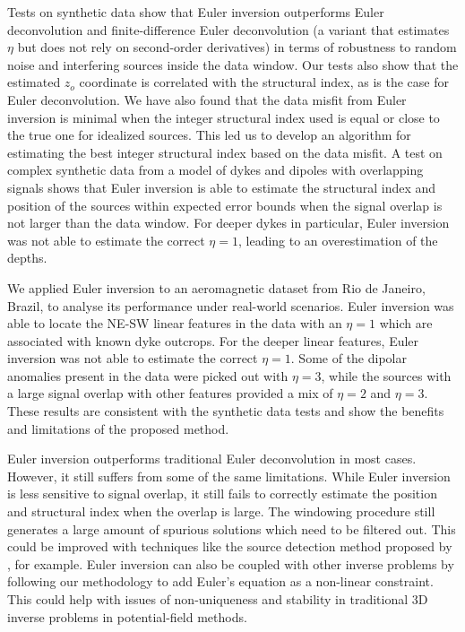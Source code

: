 Tests on synthetic data show that Euler inversion outperforms Euler
deconvolution and finite-dif\-fer\-ence Euler deconvolution (a variant that
estimates $\eta$ but does not rely on second-order derivatives) in terms of
robustness to random noise and interfering sources inside the data window.
Our tests also show that the estimated $z_o$ coordinate is correlated with the
structural index, as is the case for Euler deconvolution.
We have also found that the data misfit from Euler inversion is minimal when
the integer structural index used is equal or close to the true one for
idealized sources.
This led us to develop an algorithm for estimating the best integer structural
index based on the data misfit.
A test on complex synthetic data from a model of dykes and dipoles with
overlapping signals shows that Euler inversion is able to estimate the
structural index and position of the sources within expected error bounds when
the signal overlap is not larger than the data window.
For deeper dykes in particular, Euler inversion was not able to estimate the
correct $\eta=1$, leading to an overestimation of the depths.

We applied Euler inversion to an aeromagnetic dataset from Rio de Janeiro,
Brazil, to analyse its performance under real-world scenarios.
Euler inversion was able to locate the NE-SW linear features in the data with
an $\eta=1$ which are associated with known dyke outcrops.
For the deeper linear features, Euler inversion was not able to estimate the
correct $\eta=1$.
Some of the dipolar anomalies present in the data were picked out with
$\eta=3$, while the sources with a large signal overlap with other features
provided a mix of $\eta=2$ and $\eta=3$.
These results are consistent with the synthetic data tests and show the
benefits and limitations of the proposed method.

Euler inversion outperforms traditional Euler deconvolution in most cases.
However, it still suffers from some of the same limitations.
While Euler inversion is less sensitive to signal overlap, it still fails to
correctly estimate the position and structural index when the overlap is large.
The windowing procedure still generates a large amount of spurious solutions
which need to be filtered out.
This could be improved with techniques like the source detection method
proposed by \citet{Castro2020}, for example.
Euler inversion can also be coupled with other inverse problems by following
our methodology to add Euler's equation as a non-linear constraint.
This could help with issues of non-uniqueness and stability in traditional 3D
inverse problems in potential-field methods.


